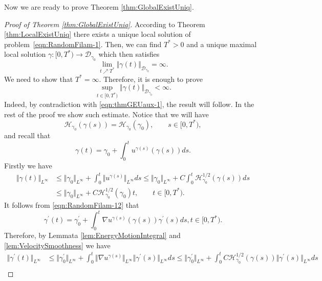 \documentclass[11pt,a4paper,reqno]{amsart}%
\theoremstyle{plain}
\theoremstyle{remark}
\theoremstyle{plain}
\numberwithin{equation}{section}
\def\liml{\lim\limits}
\def\supl{\sup\limits}
\def\supl{\mathop{\sup}\limits}
\begin{document}
Now we are ready to prove Theorem \ref{thm:GlobalExistUniq}.
\begin{proof}[Proof of Theorem \ref{thm:GlobalExistUniq}]
According to Theorem \ref{thm:LocalExistUniq} there exists a unique
local solution of problem~\eqref{eqn:RandomFilam-1}. Then, we can
find $T^*>0$ and a  unique maximal local solution 
$\gamma:[0,T^*)\to \mathcal{D}_{\gamma_0}$ which then satisfies
\begin{equation}
\liml_{t\nearrow T^*}\Vert \gamma(t)\Vert_{\mathcal{D}_{\gamma_0}}=\infty.\label{eqn:thmGEUaux-1}
\end{equation}
We need
to show that $T^*=\infty$. Therefore, it is enough to prove
$$
\supl_{t\in[0,T^*)}\Vert \gamma(t)\Vert_{\mathcal{D}_{\gamma_0}}<\infty.
$$
Indeed, by contradiction with \eqref{eqn:thmGEUaux-1}, the result
will follow. In the rest of the proof we show such estimate.
Notice that we will have
\begin{equation}
{\mathcal{H}_{\gamma_0}(\gamma(s))}={\mathcal{H}_{\gamma_0}(\gamma_0)},\qquad s\in[0,T^*),\label{eqn:EnergyMotionIntegral-1}
\end{equation}
and
recall that
\begin{equation}
\gamma(t)=\gamma_0+\int_0^tu^{\gamma(s)}(\gamma(s))ds.\label{eqn:RandomFilam-12}
\end{equation}
Firstly we have
\begin{align}
\Vert \gamma(t)\Vert_{L^{\infty}}&\leq\Vert \gamma_0\Vert_{L^{\infty}}+\int_0^t\Vert u^{\gamma(s)}\Vert_{L^{\infty}}ds
\leq\Vert \gamma_0\Vert_{L^{\infty}}+C\int_0^t\mathcal{H}_{\gamma_0}^{1/2}(\gamma(s))ds\nonumber\\
&\leq\Vert \gamma_0\Vert_{L^{\infty}}+C\mathcal{H}_{\gamma_0}^{1/2}(\gamma_0)t,\qquad t\in[0,T^*).\label{eqn:GEUEstim-1}
\end{align}
It follows from \eqref{eqn:RandomFilam-12} that
\begin{equation}
\gamma^\prime(t)=\gamma_0^\prime+\int_0^t\nabla
u^{\gamma(s)}(\gamma(s))\gamma^\prime(s)ds,t\in[0,T^*).\label{eqn:RandomFilam-12'}
\end{equation}
Therefore, by Lemmata \ref{lem:EnergyMotionIntegral} and
\ref{lem:VelocitySmoothness} we have
\begin{align}
\Vert \gamma^\prime(t)\Vert_{L^{\infty}}&\leq\Vert \gamma^\prime_0\Vert_{L^{\infty}}+\int_0^t\Vert \nabla
u^{\gamma(s)}\Vert_{L^{\infty}}\Vert \gamma^\prime(s)\Vert_{L^{\infty}}ds
\leq\Vert \gamma^\prime_0\Vert_{L^{\infty}}+\int_0^tC\mathcal{H}_{\gamma_0}^{1/2}(\gamma(s))\Vert \gamma^\prime(s)\Vert_{L^{\infty}}ds\nonumber\\

\end{align}
\end{proof}
\end{document}
